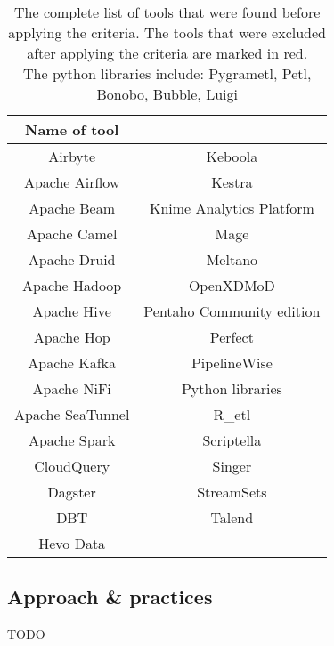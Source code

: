 \documentclass[11pt]{article}
\begin{document}
\begin{table}[H]
\centering
    \begin{tabular}{|c|c|}
        \hline
        \textbf{Name of tool} & \\ \hline
        Airbyte & {\color[HTML]{FE0000} Keboola} \\ \hline
        Apache Airflow & Kestra \\ \hline
        Apache Beam & Knime Analytics Platform \\ \hline
        Apache Camel & Mage \\ \hline
        Apache Druid & Meltano \\ \hline
        Apache Hadoop & {\color[HTML]{FE0000} OpenXDMoD} \\ \hline
        Apache Hive & Pentaho Community edition \\ \hline
        Apache Hop & Perfect \\ \hline
        Apache Kafka & PipelineWise \\ \hline
        Apache NiFi & Python libraries\text{*} \\ \hline
        Apache SeaTunnel & R\_etl \\ \hline
        Apache Spark & {\color[HTML]{FE0000} Scriptella} \\ \hline
        CloudQuery & Singer\\ \hline
        Dagster & {\color[HTML]{FE0000} StreamSets} \\ \hline
        DBT & {\color[HTML]{FE0000} Talend} \\ \hline
        {\color[HTML]{FE0000} Hevo Data} & \\ \hline
    \end{tabular}
    \caption{The complete list of tools that were found before applying the criteria. The tools that were excluded after applying the criteria are marked in red. \\
    \text{*}The python libraries include: Pygrametl, Petl, Bonobo, Bubble, Luigi}
\label{table:tools}
\end{table}

\subsection{Approach \& practices}
TODO \\
\end{document}
